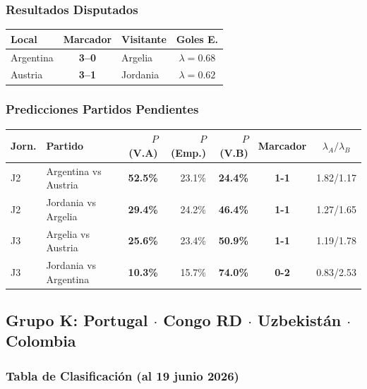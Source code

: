 \documentclass[11pt,a4paper]{article}
\newcommand{\prob}[1]{\textbf{#1\%}}
\begin{document}
\subsubsection*{Resultados Disputados}

\begin{center}
\begin{tabular}{@{}lclc@{}}
\toprule
\textbf{Local} & \textbf{Marcador} & \textbf{Visitante} & \textbf{Goles E.} \\
\midrule
  Argentina & \textbf{3--0} & Argelia & $\lambda=0.68$ \\
  Austria & \textbf{3--1} & Jordania & $\lambda=0.62$ \\
\bottomrule
\end{tabular}
\end{center}

\subsubsection*{Predicciones Partidos Pendientes}


\begin{center}
\begin{tabular}{@{}llrrrcc@{}}
\toprule
\textbf{Jorn.} & \textbf{Partido} & \textbf{$P$(V.A)} & \textbf{$P$(Emp.)} & \textbf{$P$(V.B)} & \textbf{Marcador} & \textbf{$\lambda_A/\lambda_B$} \\
\midrule
  J2 & Argentina vs Austria & \cellcolor{yellow!30}\prob{52.5} & 23.1\% & \cellcolor{red!15}\prob{24.4} & \textbf{1-1} & 1.82/1.17 \\
  J2 & Jordania vs Argelia & \cellcolor{red!15}\prob{29.4} & 24.2\% & \cellcolor{yellow!30}\prob{46.4} & \textbf{1-1} & 1.27/1.65 \\
  J3 & Argelia vs Austria & \cellcolor{red!15}\prob{25.6} & 23.4\% & \cellcolor{yellow!30}\prob{50.9} & \textbf{1-1} & 1.19/1.78 \\
  J3 & Jordania vs Argentina & \cellcolor{red!15}\prob{10.3} & 15.7\% & \cellcolor{green!20}\prob{74.0} & \textbf{0-2} & 0.83/2.53 \\
\bottomrule
\end{tabular}
\end{center}


\subsection{Grupo K: Portugal $\cdot$ Congo RD $\cdot$ Uzbekistán $\cdot$ Colombia}

\subsubsection*{Tabla de Clasificación (al 19 junio 2026)}
\end{document}
